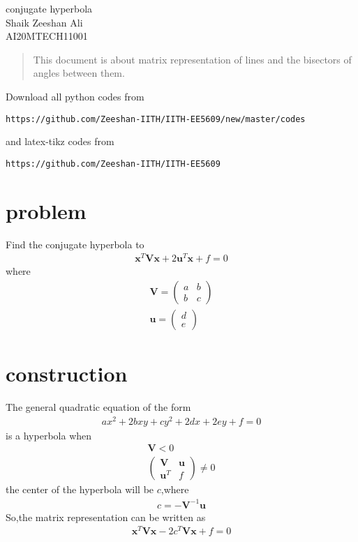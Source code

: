 \documentclass[journal,12pt,twocolumn]{IEEEtran}
\newcommand{\myvec}[1]{\ensuremath{\begin{pmatrix}#1\end{pmatrix}}}
\numberwithin{equation}{subsection}
\let\vec\mathbf
\begin{document}
\begin{center}
\huge conjugate hyperbola\\

\large Shaik Zeeshan Ali\\
\large AI20MTECH11001\\
\end{center}
\begin{abstract}
This document is about matrix representation of lines and the bisectors of angles between them.
\end{abstract}
Download all python codes from 
\begin{lstlisting}
https://github.com/Zeeshan-IITH/IITH-EE5609/new/master/codes
\end{lstlisting}

and latex-tikz codes from 
\begin{lstlisting}
https://github.com/Zeeshan-IITH/IITH-EE5609
\end{lstlisting}
\section{problem}
Find the conjugate hyperbola to 
\begin{align}
    \vec{x}^T\vec{V}\vec{x}+2\vec{u}^T\vec{x}+f=0
\end{align}
where
\begin{align}
    \vec{V}=\myvec{a&b\\b&c}\\
    \vec{u}=\myvec{d\\e}
\end{align}
\section{construction}
The general quadratic equation of the form
\begin{align}
    ax^2+2bxy+cy^2+2dx+2ey+f=0
\end{align}
is a hyperbola when
\begin{align}
    \vec{V}<0\\
    \myvec{\vec{V}&\vec{u}\\\vec{u}^T&f}\neq 0
\end{align}
the center of the hyperbola will be $c$,where
\begin{align}
    c=-\vec{V}^{-1}\vec{u}
\end{align}
So,the matrix representation can be written as
\begin{align}
    \vec{x}^T\vec{V}\vec{x}-2c^T\vec{V}\vec{x}+f=0
\end{align}
\end{document}

